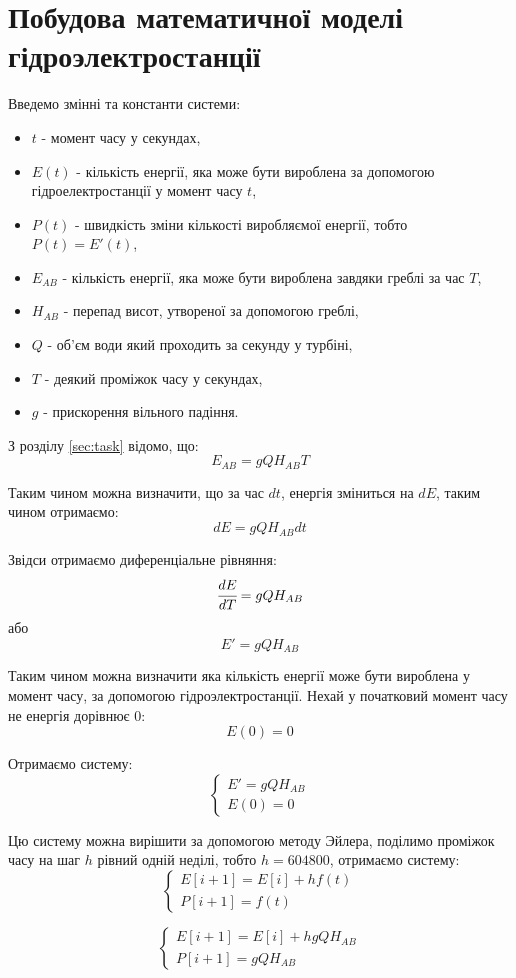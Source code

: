 \documentclass[12pt]{article}
\numberwithin{equation}{section}
\numberwithin{figure}{section}
\begin{document}
\section{Побудова математичної моделі гідроэлектростанції}
Введемо змінні та константи системи:
\begin{itemize}
\item $t$ - момент часу у секундах,
\item $E(t)$ - кількість енергії, яка може бути вироблена за допомогою гідроелектростанції у момент часу $t$,
\item $P(t)$ - швидкість зміни кількості виробляємої енергії, тобто $P(t)=E'(t)$,
\item $E_{AB}$ - кількість енергії, яка може бути вироблена завдяки греблі за час $T$,
\item $H_{AB}$ - перепад висот, утвореної за допомогою греблі,
\item $Q$ - об'єм води який проходить за секунду у турбіні,
\item $T$ - деякий проміжок часу у секундах,
\item $g$ - прискорення вільного падіння.
\end{itemize}

З розділу \ref{sec:task} відомо, що:
\[E_{AB}=gQH_{AB}T\]

Таким чином можна визначити, що за час $dt$, енергія зміниться на $dE$, таким чином отримаємо:
\[dE = gQH_{AB}dt\]

Звідси отримаємо диференціальне рівняння:
\[\cfrac{dE}{dT} = gQH_{AB}\]
або
\[E' = gQH_{AB}\]

Таким чином можна визначити яка кількість енергії може бути вироблена у момент часу, за допомогою гідроэлектростанції. Нехай у початковий момент часу не енергія дорівнює 0:
\[E(0)=0\]

Отримаємо систему:
\[\left\{
\begin{array}{l}
E' = gQH_{AB}\\E(0)=0
\end{array}
\right.\]

Цю систему можна вирішити за допомогою методу Эйлера, поділимо проміжок часу на шаг $h$ рівний одній неділі, тобто $h=604800$, отримаємо систему:
\[\left\{
\begin{array}{l}
E[i+1] = E[i] + hf(t)\\
P[i+1] = f(t)
\end{array}
\right.\]

\[\left\{
\begin{array}{l}
E[i+1] = E[i] + hgQH_{AB}\\
P[i+1] = gQH_{AB}
\end{array}
\right.\]
\end{document}
